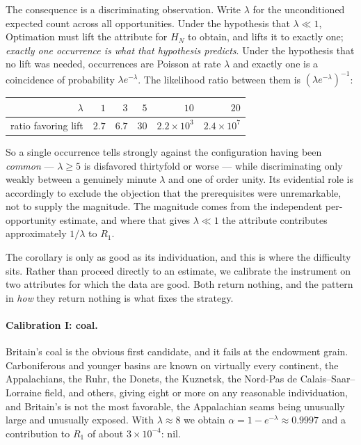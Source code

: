 \documentclass[11pt]{article}
\numberwithin{equation}{section}
\theoremstyle{plain}
\theoremstyle{definition}
\theoremstyle{remark}
\begin{document}
The consequence is a discriminating observation. Write $\lambda$ for
the unconditioned expected count across all opportunities. Under the
hypothesis that $\lambda\ll1$, Optimation must lift the attribute for
$H_N$ to obtain, and lifts it to exactly one; \emph{exactly one
occurrence is what that hypothesis predicts}. Under the hypothesis that
no lift was needed, occurrences are Poisson at rate $\lambda$ and
exactly one is a coincidence of probability $\lambda e^{-\lambda}$. The
likelihood ratio between them is $\left(\lambda
e^{-\lambda}\right)^{-1}$:
\begin{center}\small
\begin{tabular}{@{}rrrrrr@{}}
\toprule
$\lambda$ & $1$ & $3$ & $5$ & $10$ & $20$\\
\midrule
ratio favoring lift & $2.7$ & $6.7$ & $30$ & $2.2\times10^{3}$ &
$2.4\times10^{7}$\\
\bottomrule
\end{tabular}
\end{center}
So a single occurrence tells strongly against the configuration having
been \emph{common} --- $\lambda\ge5$ is disfavored thirtyfold or worse
--- while discriminating only weakly between a genuinely minute
$\lambda$ and one of order unity. Its evidential role is accordingly to
exclude the objection that the prerequisites were unremarkable, not to
supply the magnitude. The magnitude comes from the independent
per-opportunity estimate, and where that gives $\lambda\ll1$ the
attribute contributes approximately $1/\lambda$ to $R_1$.

The corollary is only as good as its individuation, and this is where
the difficulty sits. Rather than proceed directly to an estimate, we
calibrate the instrument on two attributes for which the data are good.
Both return nothing, and the pattern in \emph{how} they return nothing
is what fixes the strategy.

\paragraph{Calibration I: coal.} Britain's coal is the obvious first
candidate, and it fails at the endowment grain. Carboniferous and
younger basins are known on virtually every continent, the
Appalachians, the Ruhr, the Donets, the Kuznetsk, the Nord-Pas de
Calais--Saar--Lorraine field, and others, giving eight or more on any
reasonable individuation, and Britain's is not the most favorable, the
Appalachian seams being unusually large and unusually exposed. With
$\lambda\approx8$ we obtain $\alpha=1-e^{-\lambda}\approx0.9997$ and a
contribution to $R_1$ of about $3\times10^{-4}$: nil.
\end{document}
